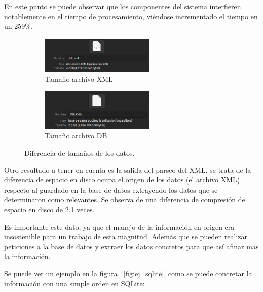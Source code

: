 \documentclass[a4paper, 12pt]{book}
\begin{document}
En este punto se puede observar que los componentes del sistema interfieren notablemente en el tiempo de procesamiento, viéndose incrementado el tiempo en un 259\%.



\begin{figure}[h]
    \centering
    \begin{subfigure}{\textwidth}
        \centering
        \includegraphics[width=0.6\textwidth]{img/tamaño_xml.png} %
        \caption{Tamaño archivo XML}
        \label{fig:xml_tam}
    \end{subfigure}
    \vspace{0.5cm} %
    \begin{subfigure}{\textwidth}
        \centering
        \includegraphics[width=0.6\textwidth]{img/tamaño_db.png} %
        \caption{Tamaño archivo DB}
        \label{fig:db_tam}
    \end{subfigure}
    \caption{Diferencia de tamaños de los datos.}
    \label{fig:tamaños}
\end{figure}


Otro resultado a tener en cuenta es la salida del parseo del XML, se trata de la diferencia de espacio en disco ocupa el origen de los datos (el archivo XML) respecto al guardado en la base de datos extrayendo los datos que se determinaron como relevantes. Se observa de una diferencia de compresión de espacio en disco de 2.1 veces. 


Es importante este dato, ya que el manejo de la información en origen era insostenible para un trabajo de esta magnitud. Además que se pueden realizar peticiones a la base de datos y extraer los datos concretos para que así afinar mas la información.

Se puede ver un ejemplo en la figura ~\ref{fig:ej_sqlite}, como se puede concretar la información con una simple orden en SQLite:
\end{document}
